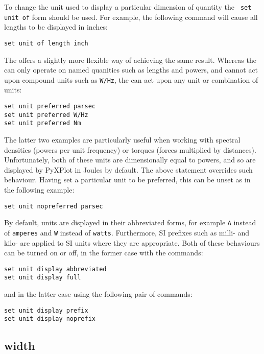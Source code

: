 To change the unit used to display a particular dimension of quantity the {\tt
set unit of} form should be used.  For example, the following command will
cause all lengths to be displayed in inches:

\begin{verbatim}
set unit of length inch
\end{verbatim}

The  offers a slightly more flexible way of
achieving the same result. Whereas the  can only operate
on named quanities such as lengths and powers, and cannot act upon compound
units such as {\tt W/Hz}, the  can act upon any
unit or combination of units:
\begin{verbatim}
set unit preferred parsec
set unit preferred W/Hz
set unit preferred Nm
\end{verbatim}
The latter two examples are particularly useful when working with spectral
densities (powers per unit frequency) or torques (forces multiplied by
distances). Unfortunately, both of these units are dimensionally equal to
powers, and so are displayed by PyXPlot in Joules by default. The above
statement overrides such behaviour. Having set a particular unit to be
preferred, this can be unset as in the following example:
\begin{verbatim}
set unit nopreferred parsec
\end{verbatim}

By default, units are displayed in their abbreviated forms, for example {\tt A}
instead of {\tt amperes} and {\tt W} instead of {\tt watts}. Furthermore, SI
prefixes such as milli- and kilo- are applied to SI units where they are
appropriate. Both of these behaviours can be turned on or off, in the former
case with the commands:

\begin{verbatim}
set unit display abbreviated
set unit display full
\end{verbatim}

\noindent and in the latter case using the following pair of commands:

\begin{verbatim}
set unit display prefix
set unit display noprefix
\end{verbatim}


\subsection{width}

